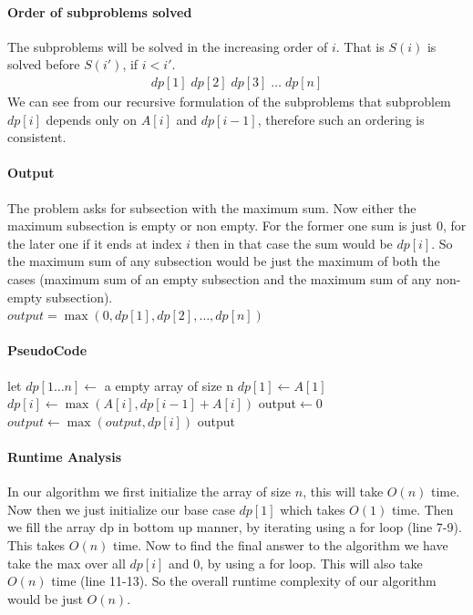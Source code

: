 \documentclass[answers]{exam}
\newcommand{\nl}{\vspace{0.2cm}\\}
\begin{document}
\begin{questions}
\begin{solution}
\paragraph{Order of subproblems solved}
The subproblems will be solved in the increasing order of $i$. That is $S(i)$ is solved before $S(i')$, if $i<i'$.
\begin{gather*}
    dp[1]\; dp[2] \; dp[3] \; \ldots \; dp[n] 
\end{gather*}
We can see from our recursive formulation of the subproblems that subproblem $dp[i]$ depends only on $A[i]$ and $dp[i-1]$, therefore such an ordering is consistent.
\paragraph{Output}
The problem asks for subsection with the maximum sum. Now either the maximum subsection is empty or non empty. For the former one sum is just $0$, for the later one if it ends at index $i$ then in that case the sum would be $dp[i]$. So the maximum sum of any subsection would be just the maximum of both the cases (maximum sum of an empty subsection and the maximum sum of any non-empty subsection). \nl
$output= \max(0,dp[1],dp[2],\ldots, dp[n])$
\paragraph{PseudoCode}
\begin{algorithmic}[1]
        \State {}
    \EndIf
    \State let $dp[1 \ldots n] \gets$ a empty array of size n
    \State  $dp[1] \gets A[1] $
            \State $dp[i] \gets \max(A[i],dp[i-1]+A[i])$
    \EndFor
    \State output$\gets$0
            \State $output \gets \max(output,dp[i])$
    \EndFor
    \State \Return output
\EndFunction
\end{algorithmic}
\paragraph{Runtime Analysis}
In our algorithm we first initialize the array of size $n$, this will take $O(n)$ time. Now then we just initialize our base case $dp[1]$ which takes $O(1)$ time. Then we fill the array dp in bottom up manner, by iterating using a for loop (line 7-9). This takes $O(n)$ time. Now to find the final answer to the algorithm we have take the max over all $dp[i]$ and 0, by using a for loop. This will also take $O(n)$ time (line 11-13). So the overall runtime complexity of our algorithm would be just $O(n)$.

\end{solution}
\end{questions}
\end{document}
